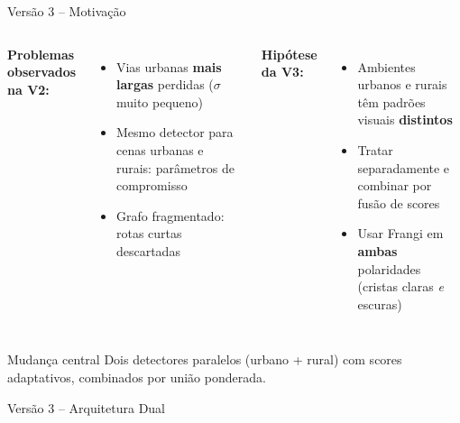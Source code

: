 \documentclass[aspectratio=169]{beamer}
\begin{document}
\begin{frame}{Versão 3 -- Motivação}
{\small
\begin{columns}
\textbf{Problemas observados na V2:}
\begin{itemize}
  \item Vias urbanas \textbf{mais largas} perdidas ($\sigma$ muito pequeno)
  \item Mesmo detector para cenas urbanas e rurais: parâmetros de compromisso
  \item Grafo fragmentado: rotas curtas descartadas
\end{itemize}
\textbf{Hipótese da V3:}
\begin{itemize}
  \item Ambientes urbanos e rurais têm padrões visuais \textbf{distintos}
  \item Tratar separadamente e combinar por fusão de scores
  \item Usar Frangi em \textbf{ambas} polaridades (cristas claras \textit{e} escuras)
\end{itemize}
\end{columns}
}
\begin{block}{\small Mudança central}
{\small Dois detectores paralelos (urbano + rural) com scores adaptativos, combinados por união ponderada.}
\end{block}
\end{frame}

\begin{frame}{Versão 3 -- Arquitetura Dual}
\centering
{\small
{}
}
\end{frame}
\end{document}
